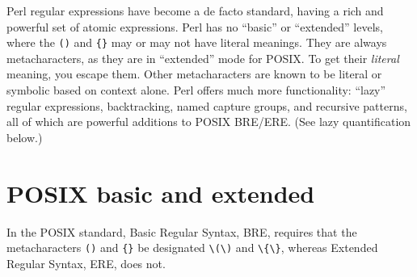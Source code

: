Perl regular expressions have become a de facto standard, having a
rich and powerful set of atomic expressions. Perl has no ``basic'' or
``extended'' levels, where the \verb|()| and \verb|{}| may or may not
have literal meanings. They are always metacharacters, as they are in
``extended'' mode for POSIX. To get their \textsl{literal} meaning,
you escape them. Other metacharacters are known to be literal or
symbolic based on context alone. Perl offers much more functionality:
``lazy'' regular expressions, backtracking, named capture groups, and
recursive patterns, all of which are powerful additions to POSIX
BRE/ERE. (See lazy quantification below.)

\section{POSIX basic and extended}
In the POSIX standard, Basic Regular Syntax, BRE, requires that the
metacharacters \verb|()| and \verb|{}| be designated \verb|\(\)| and 
\verb|\{\}|, whereas Extended Regular Syntax, ERE, does not.
